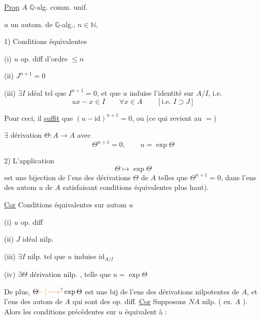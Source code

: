 \uline{Prop}
$A$ $\mathbb{Q}$-alg. comm. unif.

$u$ un autom. de $\mathbb{Q}$-alg., $n\in\mathbb{N}$,


1) Conditions équivalentes

(i) $u$ op. diff d'ordre $\leq n$

(ii) $J^{n+1}=0$

(iii) $\exists I$ idéal  tel que $I^{n+1}=0$, et que $u$ induise  l'identité sur $A/I$, i.e.
\[
ux-x\in I\qquad \forall x\in A\qquad [\text{i.e. }I\supset J]
\]

 Pour ceci, il \uline{suffit} que $(u-\mathrm{id})^{n+1}=0$, ou (ce qui revient au $=$)

$\exists$ dérivation $\Theta:A\longrightarrow A$ avec
\[
\Theta^{n+1}=0,\qquad u=\exp\Theta
\]


2) L'application
\[
\Theta\longmapsto\exp\Theta
\]
est une bijection de l'ens des dérivations $\Theta$ de $A$ telles que $\Theta^{n+1}=0$, dans l'ens des autom $u$ de $A$  satisfaisant  conditions équivalentes plus haut).

\uline{Cor} Conditions équivalentes sur autom $u$

(i) $u$ op. diff

(ii) $J$ idéal nilp.

(iii) $\exists I$ nilp.  tel que $u$ induise $\mathrm{id}_{A/I}$

(iv) $\exists\Theta$ dérivation nilp. , telle que $u=\exp\Theta$

De plus, $\Theta\unsure{\vdash|\longmapsto}\exp\Theta$ est une bij de l'ens des dérivations nilpotentes de $A$, et l'ens des autom de $A$ qui sont des op. diff.
\uline{Cor}  Supposons $NA$ nilp.  ( ex. $A$ ). Alors les conditions précédentes sur $u$ équivalent à :

